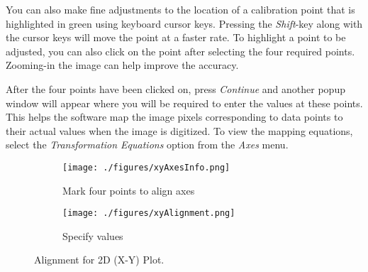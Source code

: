 \documentclass[letterpaper, 10pt]{article}
\begin{document}
You can also make fine adjustments to the location of a calibration point that is highlighted in green using keyboard cursor keys. Pressing the \emph{Shift}-key along with the cursor keys will move the point at a faster rate. To highlight a point to be adjusted, you can also click on the point after selecting the four required points. Zooming-in the image can help improve the accuracy.

After the four points have been clicked on, press \emph{Continue} and another popup window will appear where you will be required to enter the values at these points. This helps the software map the image pixels corresponding to data points to their actual values when the image is digitized. To view the mapping equations, select the \emph{Transformation Equations} option from the \emph{Axes} menu.

\begin{figure}
\centering
{\begin{subfigure}[b]{0.4\textwidth}
\texttt{[image: ./figures/xyAxesInfo.png]}
\caption{Mark four points to align axes}
\end{subfigure}
\begin{subfigure}[b]{0.4\textwidth}
\texttt{[image: ./figures/xyAlignment.png]}
\caption{Specify values}
\end{subfigure}}
\caption{Alignment for 2D (X-Y) Plot.}
\label{fig:xyAlignment}
\end{figure}
\end{document}
